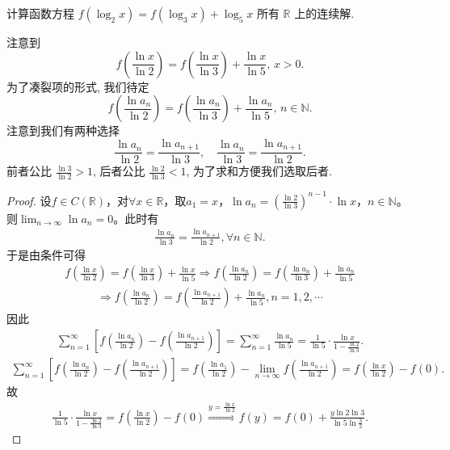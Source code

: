 \documentclass[../../main.tex]{subfiles}
\begin{document}
\begin{example}
计算函数方程 \( f(\log_2 x) = f(\log_3 x) + \log_5 x \) 所有 \(\mathbb{R}\) 上的连续解.
\end{example}
\begin{note}
注意到
\[
f\left( \frac{\ln x}{\ln 2} \right) = f\left( \frac{\ln x}{\ln 3} \right) + \frac{\ln x}{\ln 5}, \, x > 0.
\]
为了凑裂项的形式, 我们待定
\[
f\left( \frac{\ln a_n}{\ln 2} \right) = f\left( \frac{\ln a_n}{\ln 3} \right) + \frac{\ln a_n}{\ln 5}, \, n \in \mathbb{N}.
\]
注意到我们有两种选择
\[
\frac{\ln a_n}{\ln 2} = \frac{\ln a_{n+1}}{\ln 3}, \quad \frac{\ln a_n}{\ln 3} = \frac{\ln a_{n+1}}{\ln 2}.
\]
前者公比 \(\frac{\ln 3}{\ln 2} > 1\), 后者公比 \(\frac{\ln 2}{\ln 3} < 1\), 为了求和方便我们选取后者.
\end{note}
\begin{proof}
设$f \in C(\mathbb{R})$，对$\forall x \in \mathbb{R}$，取$a_1 = x$，$\ln a_n = \left( \frac{\ln 2}{\ln 3} \right)^{n-1} \cdot \ln x$，$n \in \mathbb{N}$。则$\lim_{n \to \infty} \ln a_n = 0$。此时有
\begin{align*}
\frac{\ln a_n}{\ln 3} = \frac{\ln a_{n+1}}{\ln 2}, \forall n \in \mathbb{N}.
\end{align*}
于是由条件可得
\begin{align*}
f\left( \frac{\ln x}{\ln 2} \right) = f\left( \frac{\ln x}{\ln 3} \right) + \frac{\ln x}{\ln 5} \Rightarrow f\left( \frac{\ln a_n}{\ln 2} \right) = f\left( \frac{\ln a_n}{\ln 3} \right) + \frac{\ln a_n}{\ln 5}
\end{align*}
\begin{align*}
\Rightarrow f\left( \frac{\ln a_n}{\ln 2} \right) = f\left( \frac{\ln a_{n+1}}{\ln 2} \right) + \frac{\ln a_n}{\ln 5}, n = 1, 2, \cdots
\end{align*}
因此
\begin{align*}
\sum_{n=1}^{\infty} \left[ f\left( \frac{\ln a_n}{\ln 2} \right) - f\left( \frac{\ln a_{n+1}}{\ln 2} \right) \right] = \sum_{n=1}^{\infty} \frac{\ln a_n}{\ln 5} = \frac{1}{\ln 5} \cdot \frac{\ln x}{1 - \frac{\ln 2}{\ln 3}}.
\end{align*}
\begin{align*}
\sum_{n=1}^{\infty} \left[ f\left( \frac{\ln a_n}{\ln 2} \right) - f\left( \frac{\ln a_{n+1}}{\ln 2} \right) \right] = f\left( \frac{\ln a_1}{\ln 2} \right) - \lim_{n \to \infty} f\left( \frac{\ln a_{n+1}}{\ln 2} \right) = f\left( \frac{\ln x}{\ln 2} \right) - f(0).
\end{align*}
故
\begin{align*}
\frac{1}{\ln 5} \cdot \frac{\ln x}{1 - \frac{\ln 2}{\ln 3}} = f\left( \frac{\ln x}{\ln 2} \right) - f(0) \stackrel{y = \frac{\ln x}{\ln 2}}{\Rightarrow} f(y) = f(0) + \frac{y \ln 2 \ln 3}{\ln 5 \ln \frac{3}{2}}.
\end{align*}
\end{proof}
\end{document}
